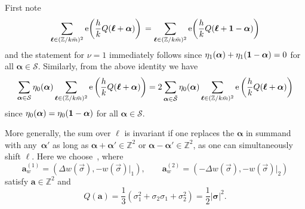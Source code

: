 \documentclass[10pt,a4paper]{amsart}
\def\CS{\mathcal{S}}
\def\ss{ \tilde{\mathcal{S}} }
\newcommand{\ZZ}{\mathbb{Z}}
\def\bal{\boldsymbol{\alpha}}
\def\bol{\boldsymbol{\ell}}
\def\ex{{\rm e}}
\theoremstyle{definition}
\numberwithin{equation}{section}
\begin{document}
First note
\[
\sum_{\boldsymbol{\ell}\in (\ZZ/k\bar m)^2 } \ex\!\left(\frac{h}{k}Q(\bol+\bal)\right)\,
= \sum_{\boldsymbol{\ell}\in (\ZZ/k\bar m)^2 }\ex\!\left(\frac{h}{k}Q(\bol+{\bf 1}-\bal)\right)
\]
and the statement for $\nu=1$ immediately follows since $\eta_1(\bal)+\eta_1({\bf 1}-\bal)=0$ for all $\bal \in \CS$. Similarly, from the above identity we have
\begin{equation}\label{eqn:prooflem131}
\sum_{\bal\in\CS} \eta_0(\bal) \sum_{\boldsymbol{\ell}\in (\ZZ/k\bar m)^2 }\ex\left(\frac{h}{k}Q(\bol+\bal)\right)
= 2 \sum_{\bal\in\ss}\eta_0 (\bal) \sum_{\boldsymbol{\ell}\in (\ZZ/k\bar m)^2 }\ex\left(\frac{h}{k}Q(\bol+\bal)\right)\end{equation}
since $\eta_0(\bal)=\eta_0({\bf 1}-\bal)$ for all $\bal \in \CS$.


More generally, the sum over $\bol$ is invariant if one replaces the $\bal$ in summand with any~$\bal'$ as long as $\bal + \bal'\!\in \ZZ^2$ or $\bal -\bal'\in \ZZ^2$, as one can simultaneously shift $\bol$. Here we choose~\smash{$\bal_w^{(i)'}\! = \frac{1}{ m} \mathbf{a}_w^{(i)}$}, where
\begin{equation*}%
\mathbf{a}_w^{(1)}=
\left(\Delta w(\vec{\sigma}), -
{w(\vec{\sigma})\lvert_1}{}\right), \qquad
\mathbf{a}_w^{(2)}=
\left(-\Delta w(\vec{\sigma}),
-{w(\vec{\sigma})\lvert_2}\right)
\end{equation*}
satisfy $\mathbf{a} \in \ZZ^2$ and
\begin{equation}\label{eqn:norm_a}
Q\left( \mathbf{a} \right)=\frac{1}{3} \left(\sigma _1^2+\sigma _2 \sigma _1+\sigma _2^2\right)=\frac{1}{2} |\boldsymbol{\sigma}|^2.
\end{equation}
\end{document}
